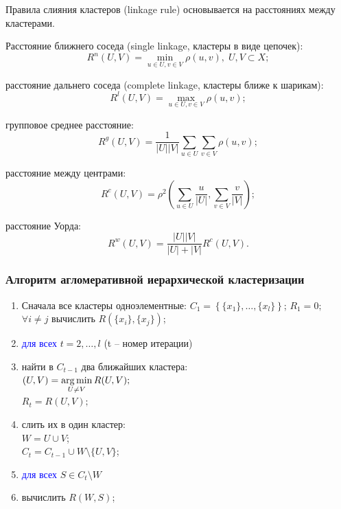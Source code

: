 Правила слияния кластеров (linkage rule) основывается на расстояниях между кластерами.

	Расстояние ближнего соседа (single linkage, кластеры в виде цепочек):
	\[R^n(U,V)=\min_{u\in U,v\in V}\rho(u,v),\;U,V\subset X;\]

	расстояние дальнего соседа (complete linkage, кластеры ближе к шарикам):
	\[R^l(U,V)=\max_{u\in U,v\in V}\rho(u,v);\]

	групповое среднее расстояние:
	\[R^g(U,V)=\frac{1}{|U||V|}\sum_{u\in U}\sum_{v\in V}\rho(u,v);\]

	расстояние между центрами:
	\[R^c(U,V)=\rho^2\left(\sum_{u\in U}\frac{u}{|U|},\sum_{v\in V}\frac{v}{|V|}\right);\]

	расстояние Уорда:
	\[R^w(U,V)=\frac{|U||V|}{|U|+|V|}R^c(U,V).\]


\subsubsection{Алгоритм агломеративной иерархической кластеризации}
	\begin{enumerate}
		\item Сначала все кластеры одноэлементные:
			$C_1=\left\{\{x_1\},\dots,\{x_l\}\right\}$; $R_1=0;$\\
			$\forall i\not=j$ вычислить $R\left(\{x_i\},\{x_j\}\right)$;
		\item\textcolor{blue}{для всех} $t=2,\dots,l$ (t -- номер итерации)
		\item\hspace{.5cm}найти в $C_{t-1}$ два ближайших кластера:\\
			\hspace{.5cm}$\displaystyle(U,V)=\operatorname*{arg\,min}_{U \not= V}R(U,V);$\\
			\hspace{.5cm}$R_t=R(U,V);$
		\item\hspace{.5cm}слить их в один кластер:\\
			\hspace{.5cm}$W=U\cup V$;\\
			\hspace{.5cm}$C_t=C_{t-1}\cup W\setminus\{U,V\}$;
		\item\hspace{.5cm}\textcolor{blue}{для всех} $S \in C_t \setminus W$
		\item\hspace{1cm}вычислить $R(W,S)$;%
	\end{enumerate}

